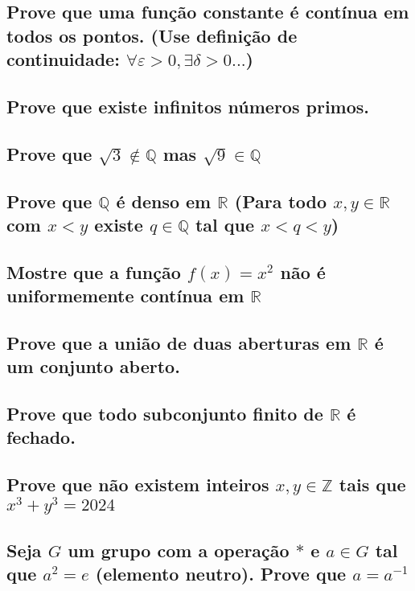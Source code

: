 \documentclass{article}
\begin{document}
\subsection{Prove que uma função constante é contínua em todos os pontos. (Use definição de continuidade: $\forall \varepsilon \gt 0, \exists \delta \gt 0...$)}

\subsection{Prove que existe infinitos números primos.}

\subsection{Prove que $\sqrt{3} \notin \mathbb{Q}$ mas $\sqrt{9} \in \mathbb{Q}$}

\subsection{Prove que $\mathbb{Q}$ é denso em $\mathbb{R}$ (Para todo $x, y \in \mathbb{R}$ com $x \lt y$ existe $q \in \mathbb{Q}$ tal que $x \lt q \lt y$)}

\subsection{Mostre que a função $f(x) = x^2$ não é uniformemente contínua em $\mathbb{R}$}

\subsection{Prove que a união de duas aberturas em $\mathbb{R}$ é um conjunto aberto.}

\subsection{Prove que todo subconjunto finito de $\mathbb{R}$ é fechado.}

\subsection{Prove que não existem inteiros $x, y \in \mathbb{Z}$ tais que $x^3 + y^3 = 2024$}

\subsection{Seja $G$ um grupo com a operação $*$ e $a \in G$ tal que $a^2 = e$ (elemento neutro). Prove que $a = a^{-1}$}
\end{document}
